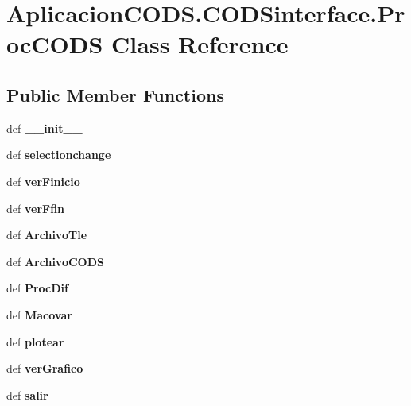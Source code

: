 \section{\-Aplicacion\-C\-O\-D\-S.\-C\-O\-D\-Sinterface.\-Proc\-C\-O\-D\-S \-Class \-Reference}
\label{class_aplicacion_c_o_d_s_1_1_c_o_d_sinterface_1_1_proc_c_o_d_s}
\subsection*{\-Public \-Member \-Functions}
\begin{DoxyCompactItemize}
\item 
def {\bf \-\_\-\-\_\-init\-\_\-\-\_\-}
\item 
def {\bf selectionchange}
\item 
def {\bf ver\-Finicio}
\item 
def {\bf ver\-Ffin}
\item 
def {\bf \-Archivo\-Tle}
\item 
def {\bf \-Archivo\-C\-O\-D\-S}
\item 
def {\bf \-Proc\-Dif}
\item 
def {\bf \-Macovar}
\item 
def {\bf plotear}
\item 
def {\bf ver\-Grafico}
\item 
def {\bf salir}
\end{DoxyCompactItemize}
